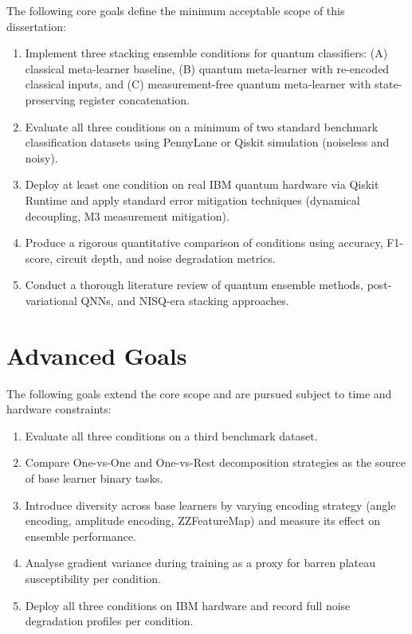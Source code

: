 \documentclass[]{UCD_CS_FYP_Report}
\begin{document}
The following core goals define the minimum acceptable scope of this dissertation:

\begin{enumerate}
    \item Implement three stacking ensemble conditions for quantum classifiers: (A) classical meta-learner baseline, (B) quantum meta-learner with re-encoded classical inputs, and (C) measurement-free quantum meta-learner with state-preserving register concatenation.
    \item Evaluate all three conditions on a minimum of two standard benchmark classification datasets using PennyLane or Qiskit simulation (noiseless and noisy).
    \item Deploy at least one condition on real IBM quantum hardware via Qiskit Runtime and apply standard error mitigation techniques (dynamical decoupling, M3 measurement mitigation).
    \item Produce a rigorous quantitative comparison of conditions using accuracy, F1-score, circuit depth, and noise degradation metrics.
    \item Conduct a thorough literature review of quantum ensemble methods, post-variational QNNs, and NISQ-era stacking approaches.
\end{enumerate}

\section{Advanced Goals}

The following goals extend the core scope and are pursued subject to time and hardware constraints:

\begin{enumerate}
    \item Evaluate all three conditions on a third benchmark dataset.
    \item Compare One-vs-One and One-vs-Rest decomposition strategies as the source of base learner binary tasks.
    \item Introduce diversity across base learners by varying encoding strategy (angle encoding, amplitude encoding, ZZFeatureMap) and measure its effect on ensemble performance.
    \item Analyse gradient variance during training as a proxy for barren plateau susceptibility per condition.
    \item Deploy all three conditions on IBM hardware and record full noise degradation profiles per condition.
\end{enumerate}
\end{document}

